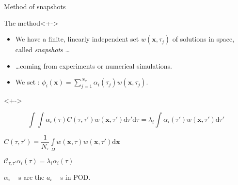 \begin{frame}{Method of snapshots}
%
\begin{block}{The method}<+->
\begin{itemize}
\item<+-> We have a finite, linearly independent set $w(\mathbf{x},\tau_j)$ of solutions in space, called \emph{snapshots} \dots
\item<+-> \dots coming from experiments or numerical simulations.
\item<+-> We set : $\phi_i(\mathbf{x})=\sum\limits_{j=1}^{N_{\tau}}\alpha_i(\tau_j) w(\mathbf{x},\tau_j)$.
\end{itemize}
\end{block}
%
\begin{block}{}<+->%
\begin{description}
\item<+-> [Fredholm equation]
\[%
\int\int\alpha_i(\tau)C(\tau,\tau')w(\mathbf{x},\tau ')\text{d}\tau'\text{d}\tau%
=\lambda_i\int\alpha_i(\tau')w(\mathbf{x},\tau')\text{d}\tau'%
\]
\item<+-> [Time-correlation tensor] $C(\tau,\tau ')=\dfrac{1}{N_{\tau}}\int\limits_{\Omega} w(\mathbf{x},\tau)w(\mathbf{x},\tau')\text{d}\mathbf{x}$
\item<+-> [Eigenvalue problem] $\mathcal{C}_{\tau,\tau'}\alpha_i(\tau)=\lambda_i\alpha_i(\tau)$
\item<+-> [POD] $\alpha_i-$s are the $a_i-$s in POD.
\end{description}
\end{block}
%
\end{frame}

